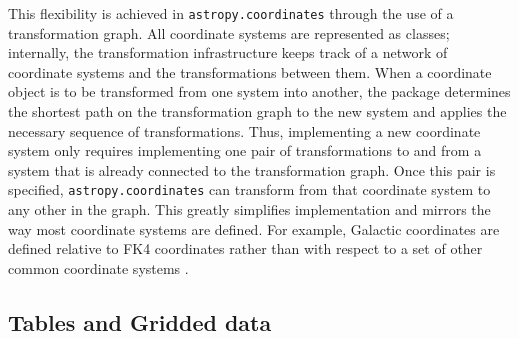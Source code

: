 \documentclass[traditabstract]{aa}
\begin{document}
This flexibility is achieved in \texttt{astropy.coordinates} through the use of
a transformation graph. All coordinate systems are represented as classes;
internally, the transformation infrastructure keeps track of a network of
coordinate systems and the transformations between them. When a coordinate
object is to be transformed from one system into another, the package
determines the shortest path on the transformation graph to the new system and
applies the necessary sequence of transformations. Thus, implementing a new
coordinate system only requires implementing one pair of transformations to and
from a system that is already connected to the transformation graph. Once this
pair is specified, \texttt{astropy.coordinates} can transform from that
coordinate system to any other in the graph. This greatly simplifies
implementation and mirrors the way most coordinate systems are defined. For
example, Galactic coordinates are defined relative to FK4 coordinates rather
than with respect to a set of other common coordinate systems \citep{galcoords,
reid04}.

\subsection{Tables and Gridded data}


\label{sec:table}
\end{document}
